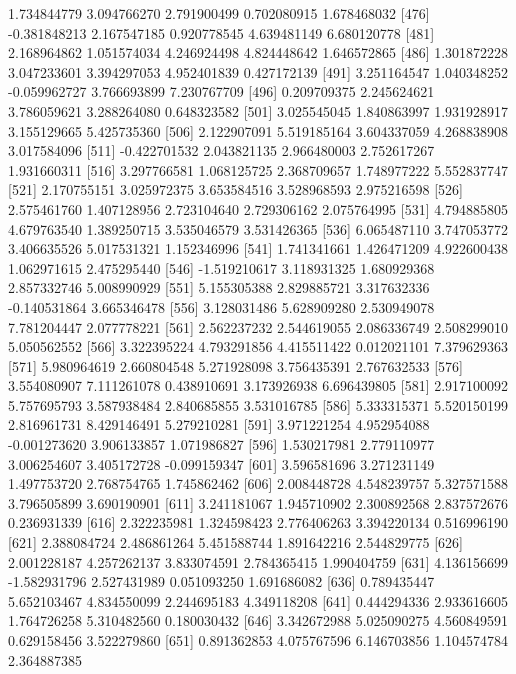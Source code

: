 \documentclass[12pt]{article}
\begin{document}
\begin{Schunk}
\begin{Soutput}
 [471]  1.734844779  3.094766270  2.791900499  0.702080915  1.678468032
 [476] -0.381848213  2.167547185  0.920778545  4.639481149  6.680120778
 [481]  2.168964862  1.051574034  4.246924498  4.824448642  1.646572865
 [486]  1.301872228  3.047233601  3.394297053  4.952401839  0.427172139
 [491]  3.251164547  1.040348252 -0.059962727  3.766693899  7.230767709
 [496]  0.209709375  2.245624621  3.786059621  3.288264080  0.648323582
 [501]  3.025545045  1.840863997  1.931928917  3.155129665  5.425735360
 [506]  2.122907091  5.519185164  3.604337059  4.268838908  3.017584096
 [511] -0.422701532  2.043821135  2.966480003  2.752617267  1.931660311
 [516]  3.297766581  1.068125725  2.368709657  1.748977222  5.552837747
 [521]  2.170755151  3.025972375  3.653584516  3.528968593  2.975216598
 [526]  2.575461760  1.407128956  2.723104640  2.729306162  2.075764995
 [531]  4.794885805  4.679763540  1.389250715  3.535046579  3.531426365
 [536]  6.065487110  3.747053772  3.406635526  5.017531321  1.152346996
 [541]  1.741341661  1.426471209  4.922600438  1.062971615  2.475295440
 [546] -1.519210617  3.118931325  1.680929368  2.857332746  5.008990929
 [551]  5.155305388  2.829885721  3.317632336 -0.140531864  3.665346478
 [556]  3.128031486  5.628909280  2.530949078  7.781204447  2.077778221
 [561]  2.562237232  2.544619055  2.086336749  2.508299010  5.050562552
 [566]  3.322395224  4.793291856  4.415511422  0.012021101  7.379629363
 [571]  5.980964619  2.660804548  5.271928098  3.756435391  2.767632533
 [576]  3.554080907  7.111261078  0.438910691  3.173926938  6.696439805
 [581]  2.917100092  5.757695793  3.587938484  2.840685855  3.531016785
 [586]  5.333315371  5.520150199  2.816961731  8.429146491  5.279210281
 [591]  3.971221254  4.952954088 -0.001273620  3.906133857  1.071986827
 [596]  1.530217981  2.779110977  3.006254607  3.405172728 -0.099159347
 [601]  3.596581696  3.271231149  1.497753720  2.768754765  1.745862462
 [606]  2.008448728  4.548239757  5.327571588  3.796505899  3.690190901
 [611]  3.241181067  1.945710902  2.300892568  2.837572676  0.236931339
 [616]  2.322235981  1.324598423  2.776406263  3.394220134  0.516996190
 [621]  2.388084724  2.486861264  5.451588744  1.891642216  2.544829775
 [626]  2.001228187  4.257262137  3.833074591  2.784365415  1.990404759
 [631]  4.136156699 -1.582931796  2.527431989  0.051093250  1.691686082
 [636]  0.789435447  5.652103467  4.834550099  2.244695183  4.349118208
 [641]  0.444294336  2.933616605  1.764726258  5.310482560  0.180030432
 [646]  3.342672988  5.025090275  4.560849591  0.629158456  3.522279860
 [651]  0.891362853  4.075767596  6.146703856  1.104574784  2.364887385

\end{Soutput}
\end{Schunk}
\end{document}
